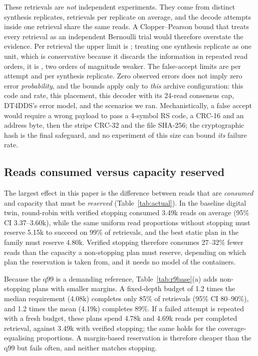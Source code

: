 \documentclass[acmsmall,screen]{acmart}
\begin{document}
These retrievals are \emph{not} independent experiments.  They come from \SafeUnits{} distinct synthesis
replicates, \SafePerUnit{} retrievals per replicate on average, and the decode attempts inside one
retrieval share the same reads.  A Clopper--Pearson bound that treats every retrieval as an independent
Bernoulli trial would therefore overstate the evidence.  Per retrieval the upper limit is \SafeWUB{};
treating one synthesis replicate as one unit, which is conservative because it discards the information
in repeated read orders, it is \SafeWUBc{}, two orders of magnitude weaker.  The false-accept limits are
\SafeFUB{} per attempt and \SafeFUBc{} per synthesis replicate.  Zero observed errors does not imply zero
error \emph{probability}, and the bounds apply only to \emph{this} archive configuration: this code and
rate, this placement, this decoder with its 24-read consensus cap, DT4DDS's error model, and the
scenarios we ran.  Mechanistically, a false accept would require a wrong payload to pass a 4-symbol RS
code, a CRC-16 and an address byte, then the stripe CRC-32 and the file SHA-256; the cryptographic hash is
the final safeguard, and no experiment of this size can bound \emph{its} failure rate.

\subsection{Reads consumed versus capacity reserved}\label{sec:res-actual}

The largest effect in this paper is the difference between reads that are \emph{consumed} and capacity
that must be \emph{reserved} (Table~\ref{tab:actual}).  In the baseline digital twin, round-robin with
verified stopping consumed 3.49k reads on average (95\% CI 3.37--3.60k), while the same uniform read
proportions without stopping must reserve 5.15k to succeed on 99\% of retrievals, and the best static
plan in the family must reserve 4.80k.  Verified stopping therefore consumes 27--32\% fewer reads than
the capacity a non-stopping plan must reserve, depending on which plan the reservation is taken from, and
it needs no model of the containers.


Because the q99 is a demanding reference, Table~\ref{tab:r9base}(a) adds non-stopping plans with smaller
margins.  A fixed-depth budget of 1.2 times the median requirement (4.08k) completes only
85\% of retrievals (95\% CI 80--90\%), and 1.2 times the mean
(4.19k) completes 89\%.  If a failed attempt is repeated with a fresh budget,
these plans spend 4.78k and 4.69k reads per completed retrieval, against 3.49k with
verified stopping; the same holds for the coverage-equalising proportions.  A margin-based reservation is
therefore cheaper than the q99 but fails often, and neither matches stopping.
\end{document}
